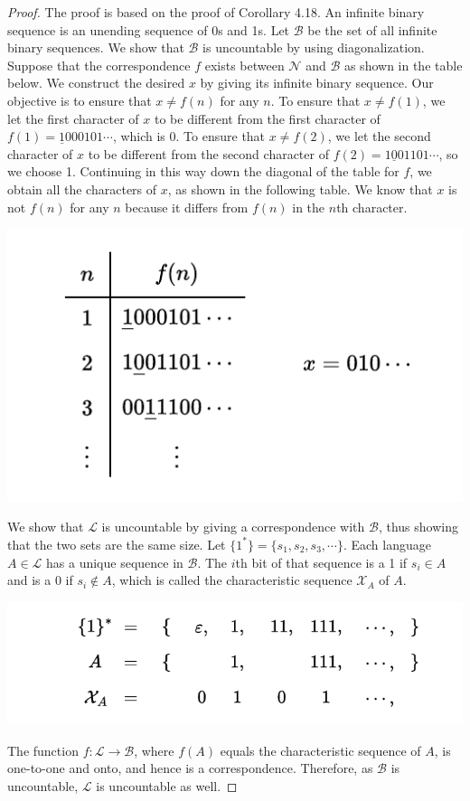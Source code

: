 \documentclass[11pt]{article}
\begin{document}
\begin{proof}
The proof is based on the proof of Corollary 4.18. An infinite binary sequence is an unending sequence of 0s and 1s. Let $\mathcal{B}$ be the set of all infinite binary sequences. We show that $\mathcal{B}$ is uncountable by using diagonalization. Suppose that the correspondence $f$ exists between $\mathcal{N}$ and $\mathcal{B}$ as shown in the table below. We construct the desired $x$ by giving its infinite binary sequence. Our objective is to ensure that $x \neq f(n)$ for any $n$. To ensure that $x \neq f(1)$, we let the first character of $x$ to be different from the first character of $f(1)=\underline{1}000101\cdots$, which is 0. To ensure that $x \neq f(2)$, we let the second character of $x$ to be different from the second character of $f(2)=1\underline{0}01101\cdots$, so we choose 1. Continuing in this way down the diagonal of the table for $f$, we obtain all the characters of $x$, as shown in the following table. We know that $x$ is not $f(n)$ for any $n$ because it differs from $f(n)$ in the $n$th character.

\begin{center}
\includegraphics[scale=0.8]{Figures/Problem5.20a.pdf}
\end{center}

We show that $\mathcal{L}$ is uncountable by giving a correspondence with $\mathcal{B}$, thus showing that the two sets are the same size. Let $\{1^{*}\} = \{s_1, s_2, s_3, \cdots\}$. Each language $A \in \mathcal{L}$ has a unique sequence in $\mathcal{B}$. The $i$th bit of that sequence is a 1 if $s_i \in A$ and is a 0 if $s_i \notin A$, which is called the characteristic sequence $\mathcal{X}_A$ of $A$.

\begin{center}
\includegraphics[scale=0.8]{Figures/Problem5.20b.pdf}
\end{center}

The function $f:\mathcal{L}\longrightarrow\mathcal{B}$, where $f(A)$ equals the characteristic sequence of $A$, is one-to-one and onto, and hence is a correspondence. Therefore, as $\mathcal{B}$ is uncountable, $\mathcal{L}$ is uncountable as well.
\end{proof}
\end{document}
